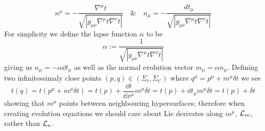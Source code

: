 \begin{equation} n^\mu = -\frac{\nabla^\mu t}{\sqrt{|g_{\mu\nu}\nabla^\mu t \nabla^\nu t|}} \quad \& \quad  n_\mu = -\frac{dt_\mu}{\sqrt{|g_{\mu\nu}\nabla^\mu t \nabla^\nu t|}}\end{equation}
For simplicity we define the lapse function $\alpha$ to be
\begin{equation}\alpha :=  \frac{1}{\sqrt{|g_{\mu\nu}\nabla^\mu t \nabla^\nu t|}} \end{equation}
giving us $n_\mu = -\alpha \dd t_\mu$ as well as the normal evolution vector $m_\mu = \alpha n_\mu$. Defining two infinitessimaly close points $(p,q)\in(\Sigma_t,\Sigma_{t'})$ where $ q^\mu = p^\mu + m^\mu\delta t$ we see
\begin{equation} t(q) = t(p^\mu +  m^\mu\delta t) = t(p) + \frac{\dd t}{\dd x^\mu}m^\mu\delta t = t(p) + \dd t_\mu m^\mu \delta t =  t(p) + \delta t\end{equation} 
showing that $m^\mu$ points between neighbouring hypersurfaces; therefore when creating evolution equations we should care about Lie derivates along $m^\mu$, $\mathcal{L}_m$, rather than $\mathcal{L}_n$.



